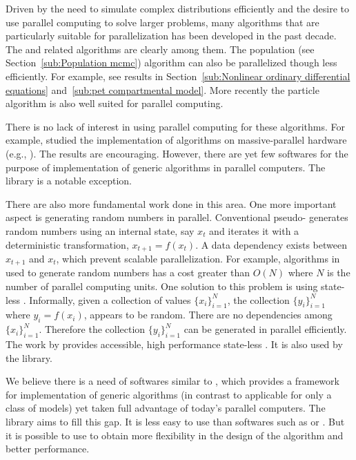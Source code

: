Driven by the need to simulate complex distributions efficiently and the
desire to use parallel computing to solve larger problems, many algorithms
that are particularly suitable for parallelization has been developed in the
past decade. The \smc and related algorithms are clearly among them. The
population \mcmc (see Section~\ref{sub:Population mcmc}) algorithm can also be
parallelized though less efficiently. For example, see results in
Section~\ref{sub:Nonlinear ordinary differential equations}
and~\ref{sub:pet compartmental model}. More recently
the particle \mcmc algorithm \cite{Andrieu:2010gc} is also well suited for
parallel computing.

There is no lack of interest in using parallel computing for these algorithms.
For example, \cite{Lee:2010fm} studied the implementation of \smc algorithms
on massive-parallel hardware (e.g., \gpu). The results are encouraging.
However, there are yet few softwares for the purpose of implementation of
generic \smc algorithms in parallel computers. The \libbi library is a notable
exception.

There are also more fundamental work done in this area. One more important
aspect is generating random numbers in parallel. Conventional pseudo-\rng
generates random numbers using an internal state, say $x_t$ and iterates it
with a deterministic transformation, $x_{t+1} = f(x_t)$. A data dependency
exists between $x_{t+1}$ and $x_t$, which prevent scalable parallelization.
For example, algorithms in \cite{Lee:2010fm} used to generate random numbers
has a cost greater than $O(N)$ where $N$ is the number of parallel computing
units. One solution to this problem is using state-less \rng. Informally,
given a collection of values $\{x_i\}_{i=1}^N$, the collection
$\{y_i\}_{i=1}^N$ where $y_i = f(x_i)$, appears to be random. There are no
dependencies among $\{x_i\}_{i=1}^N$. Therefore the collection
$\{y_i\}_{i=1}^N$ can be generated in parallel efficiently. The work by
\cite{Salmon:2011um} provides accessible, high performance state-less \rng. It
is also used by the \vsmc library.

We believe there is a need of softwares similar to \smctc, which provides a
framework for implementation of generic \smc algorithms (in contrast to
applicable for only a class of models) yet taken full advantage of today's
parallel computers. The \vsmc library aims to fill this gap. It is less easy
to use than softwares such as \libbi or \biips. But it is possible to use to
obtain more flexibility in the design of the algorithm and better performance.

